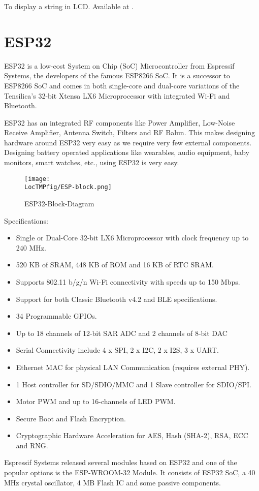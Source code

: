 \begin{pycode}
  {To display a string in LCD. Available at
    .}
  \label{py:lcd}
  
\end{pycode}

\section{ESP32}
ESP32 is a low-cost System on Chip (SoC) Microcontroller from
Espressif Systems, the developers of the famous ESP8266 SoC. It
is a successor to ESP8266 SoC and comes in both single-core and
dual-core variations of the Tensilica’s 32-bit Xtensa LX6
Microprocessor with integrated Wi-Fi and Bluetooth.

ESP32 has an integrated RF components like Power Amplifier,
Low-Noise Receive Amplifier, Antenna Switch, Filters and RF
Balun. This makes designing hardware around ESP32 very easy as
we
require very few external components. Designing battery operated
applications like wearables, audio equipment, baby monitors,
smart watches, etc., using ESP32 is very easy.

\begin{figure}
  \centering
  \texttt{[image: \\LocTMPfig/ESP-block.png]}
  \caption{ESP32-Block-Diagram}
  \label{fig:ESPblock}
\end{figure}

Specifications:
\begin{itemize}
\item Single or Dual-Core 32-bit LX6 Microprocessor with clock
frequency up to 240 MHz.
\item 520 KB of SRAM, 448 KB of ROM and 16 KB of RTC SRAM.
\item Supports 802.11 b/g/n Wi-Fi connectivity with speeds up to
150 Mbps.
\item Support for both Classic Bluetooth v4.2 and BLE
specifications.
\item 34 Programmable GPIOs.
\item Up to 18 channels of 12-bit SAR ADC and 2 channels of
8-bit DAC
\item Serial Connectivity include 4 x SPI, 2 x I2C, 2 x I2S, 3 x
UART.
\item Ethernet MAC for physical LAN Communication (requires
external PHY).
\item 1 Host controller for SD/SDIO/MMC and 1 Slave controller
for SDIO/SPI.
\item Motor PWM and up to 16-channels of LED PWM.
\item Secure Boot and Flash Encryption.
\item Cryptographic Hardware Acceleration for AES, Hash (SHA-2),
RSA, ECC and RNG.
\end{itemize}
Espressif Systems released several modules based on ESP32 and
one of the popular options is the ESP-WROOM-32 Module. It
consists of ESP32 SoC, a 40 MHz crystal oscillator, 4 MB Flash
IC and
some passive components.

